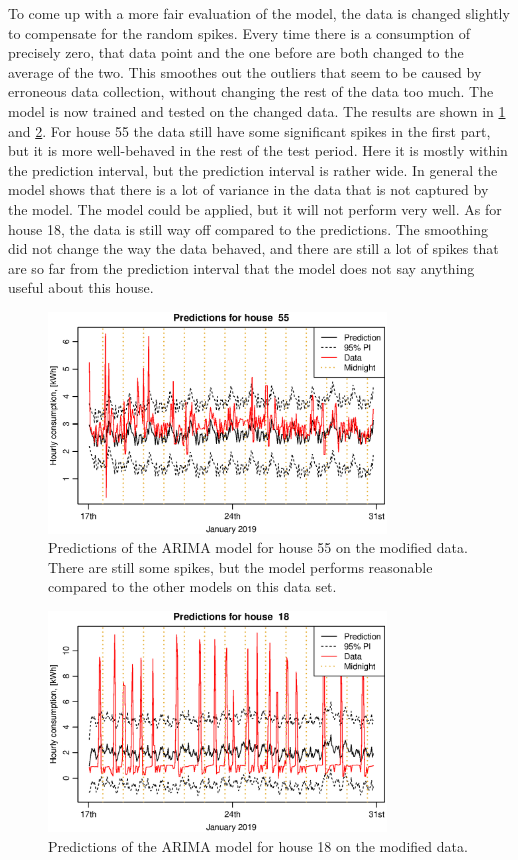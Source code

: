 \noindent To come up with a more fair evaluation of the model, the data is changed slightly to compensate for the random spikes. Every time there is a consumption of precisely zero, that data point and the one before are both changed to the average of the two. This smoothes out the outliers that seem to be caused by erroneous data collection, without changing the rest of the data too much. The model is now trained and tested on the changed data. The results are shown in \cref{fig:arima2_pred_55} and \cref{fig:arima2_pred_18}. For house 55 the data still have some significant spikes in the first part, but it is more well-behaved in the rest of the test period. Here it is mostly within the prediction interval, but the prediction interval is rather wide. In general the model shows that there is a lot of variance in the data that is not captured by the model. The model could be applied, but it will not perform very well. As for house 18, the data is still way off compared to the predictions. The smoothing did not change the way the data behaved, and there are still a lot of spikes that are so far from the prediction interval that the model does not say anything useful about this house.
\begin{figure}[ht]
    \centering
    \includegraphics[width=0.8\textwidth]{../../../figures/arimax/arima2_pred_55.eps}
    \caption{Predictions of the ARIMA model for house 55 on the modified data. There are still some spikes, but the model performs reasonable compared to the other models on this data set.}
    \label{fig:arima2_pred_55}
\end{figure}
\begin{figure}[ht]
    \centering
    \includegraphics[width=0.8\textwidth]{../../../figures/arimax/arima2_pred_18.eps}
    \caption{Predictions of the ARIMA model for house 18 on the modified data.}
    \label{fig:arima2_pred_18}
\end{figure}

